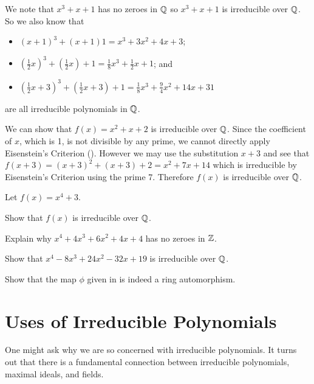 \begin{example}
    We note that $x^3 + x + 1$ has no zeroes in $\mathbb{Q}$ so $x^3 + x + 1$ is irreducible over $\mathbb{Q}$. So we also know that
    \begin{itemize}
        \item $(x+1)^3 + (x+1) 1 = x^3 + 3x^2 + 4x + 3$;
        \item $(\frac12x)^3 + (\frac12x) + 1 = \frac18x^3 + \frac12x + 1$; and
        \item $(\frac12x + 3)^3 + (\frac12x + 3) + 1 = \frac18x^3 + \frac94x^2 + 14x + 31$
    \end{itemize}
    are all irreducible polynomials in $\mathbb{Q}$.
\end{example}

\begin{example}
    We can show that $f(x) = x^2 + x + 2$ is irreducible over $\mathbb{Q}$. Since the coefficient of $x$, which is 1, is not divisible by any prime, we cannot directly apply Eisenstein's Criterion (). However we may use the substitution $x + 3$ and see that $f(x+3) = (x+3)^2 + (x+3) + 2 = x^2 + 7x + 14$ which is irreducible by Eisenstein's Criterion using the prime 7. Therefore $f(x)$ is irreducible over $\mathbb{Q}$.
\end{example}

\begin{exercise}
    Let $f(x) = x^4 + 3$.
    \begin{partquestions}{\roman*}
        \item Show that $f(x)$ is irreducible over $\mathbb{Q}$.
        \item Explain why $x^4 + 4x^3 + 6x^2 + 4x + 4$ has no zeroes in $\mathbb{Z}$.
        \item Show that $x^4 - 8x^3 + 24x^2 - 32x + 19$ is irreducible over $\mathbb{Q}$.
    \end{partquestions}
\end{exercise}

\begin{exercise}\label{exercise-substitution-by-constant-factor-multiple-map}
    Show that the map $\phi$ given in  is indeed a ring automorphism.
\end{exercise}

\section{Uses of Irreducible Polynomials}
One might ask why we are so concerned with irreducible polynomials. It turns out that there is a fundamental connection between irreducible polynomials, maximal ideals, and fields.

